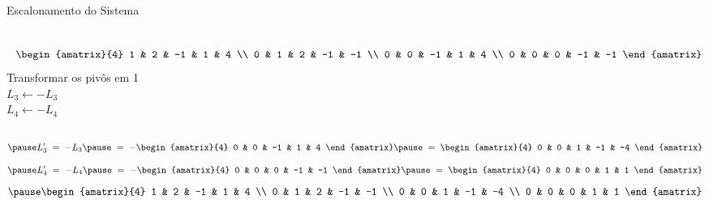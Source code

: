 \begin{resolution}{Escalonamento do Sistema}
\begin{columns}
  \[\;\;\,
    \begin{amatrix}{4}
      1 & 2 & -1 & 1  & 4  \\
      0 & 1 & 2  & -1 & -1 \\
      0 & 0 & -1 & 1  & 4  \\
      0 & 0 & 0  & -1 & -1
    \end{amatrix}
  \]
  \pause
{}
  Transformar os pivôs em 1
  \\ \pause
  \(
    L_3 \leftarrow - L_3
  \)
  \\ \pause
  \(
    L_4 \leftarrow - L_4
  \)
\end{columns}
\vspace{-\baselineskip}
\[
  \pause
  L'_3
  \;=\;
  - L_3
  \pause
  \;=\;
  -
  \begin{amatrix}{4}
    0 & 0 & -1 & 1  & 4
  \end{amatrix}
  \pause
  \;=\;
  \begin{amatrix}{4}
    0 & 0 & 1  & -1 & -4
  \end{amatrix}
\]
\[
  \pause
  L'_4
  \;=\;
  - L_4
  \pause
  \;=\;
  -
  \begin{amatrix}{4}
    0 & 0 & 0  & -1 & -1
  \end{amatrix}
  \pause
  \;=\;
  \begin{amatrix}{4}
    0 & 0 & 0  & 1  & 1
  \end{amatrix}
\]
\[
  \pause
  \begin{amatrix}{4}
    1 & 2 & -1 & 1  & 4  \\
    0 & 1 & 2  & -1 & -1 \\
    0 & 0 & 1  & -1 & -4 \\
    0 & 0 & 0  & 1  & 1
  \end{amatrix}
\]
\end{resolution}


